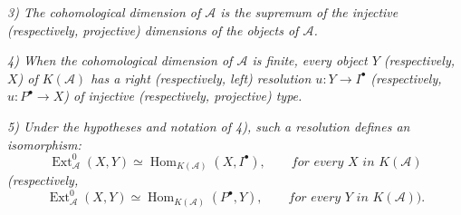 \noindent\textit{3) The cohomological dimension of $\mathcal A$ is the
supremum of the injective (respectively, projective) dimensions of the
objects of $\mathcal A$.}

\noindent\textit{4) When the cohomological dimension of $\mathcal A$ is
finite, every object $Y$ (respectively, $X$) of $K(\mathcal A)$ has a right
(respectively, left) resolution $u\colon Y\longrightarrow I^\bullet$
(respectively, $u\colon P^\bullet\longrightarrow X$) of injective
(respectively, projective) type.}

\noindent\textit{5) Under the hypotheses and notation of 4), such a
resolution defines an isomorphism:}
\[
\operatorname{Ext}_{\mathcal A}^{0}(X,Y)\simeq
\operatorname{Hom}_{K(\mathcal A)}(X,I^\bullet),
\qquad\textit{for every $X$ in $K(\mathcal A)$}
\]
\noindent\textit{(respectively,}
\[
\operatorname{Ext}_{\mathcal A}^{0}(X,Y)\simeq
\operatorname{Hom}_{K(\mathcal A)}(P^\bullet,Y),
\qquad\textit{for every $Y$ in $K(\mathcal A)$).}
\]
\endgroup
